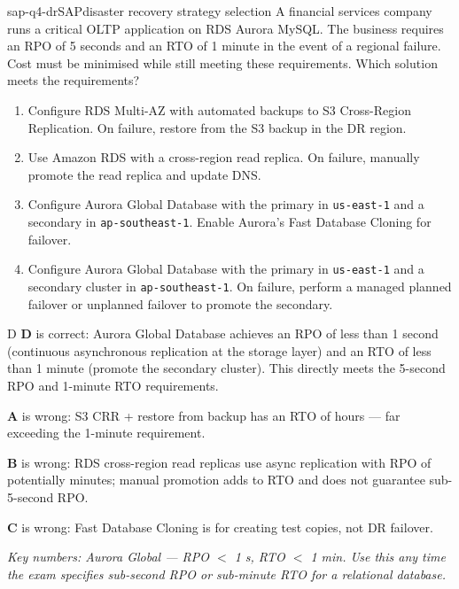 \begin{question}{sap-q4-dr}{SAP}{disaster recovery strategy selection}
A financial services company runs a critical OLTP application on RDS Aurora MySQL. The business requires an RPO of 5 seconds and an RTO of 1 minute in the event of a regional failure. Cost must be minimised while still meeting these requirements. Which solution meets the requirements?

\begin{enumerate}[label=\Alph*.]
  \item Configure RDS Multi-AZ with automated backups to S3 Cross-Region Replication. On failure, restore from the S3 backup in the DR region.
  \item Use Amazon RDS with a cross-region read replica. On failure, manually promote the read replica and update DNS.
  \item Configure Aurora Global Database with the primary in \texttt{us-east-1} and a secondary in \texttt{ap-southeast-1}. Enable Aurora's Fast Database Cloning for failover.
  \item Configure Aurora Global Database with the primary in \texttt{us-east-1} and a secondary cluster in \texttt{ap-southeast-1}. On failure, perform a managed planned failover or unplanned failover to promote the secondary.
\end{enumerate}
\end{question}

\begin{answer}{D}
\textbf{D} is correct: Aurora Global Database achieves an RPO of less than 1 second (continuous asynchronous replication at the storage layer) and an RTO of less than 1 minute (promote the secondary cluster). This directly meets the 5-second RPO and 1-minute RTO requirements.

\textbf{A} is wrong: S3 CRR + restore from backup has an RTO of hours --- far exceeding the 1-minute requirement.

\textbf{B} is wrong: RDS cross-region read replicas use async replication with RPO of potentially minutes; manual promotion adds to RTO and does not guarantee sub-5-second RPO.

\textbf{C} is wrong: Fast Database Cloning is for creating test copies, not DR failover.

\textit{Key numbers: Aurora Global --- RPO $<$ 1 s, RTO $<$ 1 min. Use this any time the exam specifies sub-second RPO or sub-minute RTO for a relational database.}
\end{answer}

